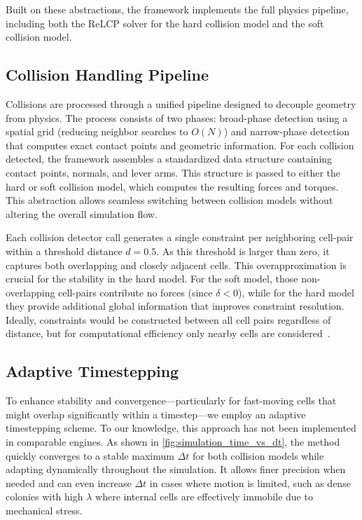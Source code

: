 \documentclass[conference]{IEEEtran}
\begin{document}
Built on these abstractions, the framework implements the full physics pipeline, including both the ReLCP solver for the hard collision model and the soft collision model.

\subsection{Collision Handling Pipeline}

Collisions are processed through a unified pipeline designed to decouple geometry from physics. The process consists of two phases: broad-phase detection using a spatial grid (reducing neighbor searches to $O(N)$) and narrow-phase detection that computes exact contact points and geometric information. For each collision detected, the framework assembles a standardized data structure containing contact points, normals, and lever arms. This structure is passed to either the hard or soft collision model, which computes the resulting forces and torques. This abstraction allows seamless switching between collision models without altering the overall simulation flow.

Each collision detector call generates a single constraint per neighboring cell-pair within a threshold distance $d = 0.5$. As this threshold is larger than zero, it captures both overlapping and closely adjacent cells. This overapproximation is crucial for the stability in the hard model. For the soft model, those non-overlapping cell-pairs contribute no forces (since $\delta < 0$), while for the hard model they provide additional global information that improves constraint resolution. Ideally, constraints would be constructed between all cell pairs regardless of distance, but for computational efficiency only nearby cells are considered~\cite{Yan2019, Yan2022}.

\subsection{Adaptive Timestepping}

To enhance stability and convergence—particularly for fast-moving cells that might overlap significantly within a timestep—we employ an adaptive timestepping scheme. To our knowledge, this approach has not been implemented in comparable engines. As shown in \autoref{fig:simulation_time_vs_dt}, the method quickly converges to a stable maximum $\Delta t$ for both collision models while adapting dynamically throughout the simulation. It allows finer precision when needed and can even increase $\Delta t$ in cases where motion is limited, such as dense colonies with high $\lambda$ where internal cells are effectively immobile due to mechanical stress.
\end{document}
